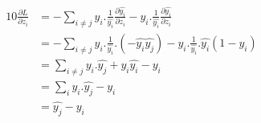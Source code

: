 \begin{enumerate}[i]
\begin{alignat}{10}
        \frac{\partial L}{\partial z_i} &= -  \sum_{i\not=j} y_i. \frac{1}{\hat{y_i}} \frac{\partial \hat{y_i}}{\partial z_i} - y_i.\frac{1}{\hat{y_i}}\frac{\partial \hat{y_i}}{\partial z_i}
        \\
        &= - \sum_{i\not=j} y_i.\frac{1}{\hat{y_i}} . (-\hat{y_i}\hat{y_j}) - y_i. \frac{1}{\hat{y_i}} . \hat{y_i} (1 - \hat{y_i})
        \\
        &= \sum_{i\not=j} y_i . \hat{y_j} + y_i \hat{y_i} - y_i
        \\
        &= \sum_i y_i . \hat{y_j} - y_i
        \\
        &= \hat{y_j} - y_i
    \end{alignat}
\end{enumerate}


